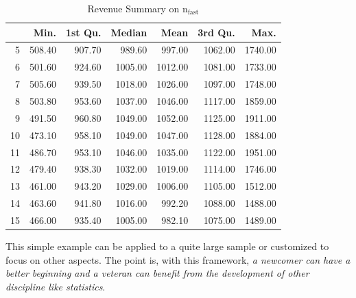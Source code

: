 \documentclass[12pt,a4paper]{article}
\begin{document}
\begin{table}[H]
\caption{Revenue Summary on $\mathrm{n_{fast}}$}
\label{tab:revenue-by-nfast}
\begin{center}
\begin{tabular}{rrrrrrr}
  \hline
 & Min. & 1st Qu. & Median & Mean & 3rd Qu. & Max. \\ 
  \hline
5 & 508.40 & 907.70 & 989.60 & 997.00 & 1062.00 & 1740.00 \\ 
  6 & 501.60 & 924.60 & 1005.00 & 1012.00 & 1081.00 & 1733.00 \\ 
  7 & 505.60 & 939.50 & 1018.00 & 1026.00 & 1097.00 & 1748.00 \\ 
  8 & 503.80 & 953.60 & 1037.00 & 1046.00 & 1117.00 & 1859.00 \\ 
  9 & 491.50 & 960.80 & 1049.00 & 1052.00 & 1125.00 & 1911.00 \\ 
  10 & 473.10 & 958.10 & 1049.00 & 1047.00 & 1128.00 & 1884.00 \\ 
  11 & 486.70 & 953.10 & 1046.00 & 1035.00 & 1122.00 & 1951.00 \\ 
  12 & 479.40 & 938.30 & 1032.00 & 1019.00 & 1114.00 & 1746.00 \\ 
  13 & 461.00 & 943.20 & 1029.00 & 1006.00 & 1105.00 & 1512.00 \\ 
  14 & 463.60 & 941.80 & 1016.00 & 992.20 & 1088.00 & 1488.00 \\ 
  15 & 466.00 & 935.40 & 1005.00 & 982.10 & 1075.00 & 1489.00 \\ 
   \hline
\end{tabular}

\end{center}
\end{table}



This simple example can be applied to a quite large sample 
or customized to focus on other aspects. 
The point is, with this framework, 
\emph{a newcomer can have a 
better beginning and a veteran can benefit from the development of
other discipline like statistics}.



\clearpage

\listoffigures
\listoftables
\end{document}
